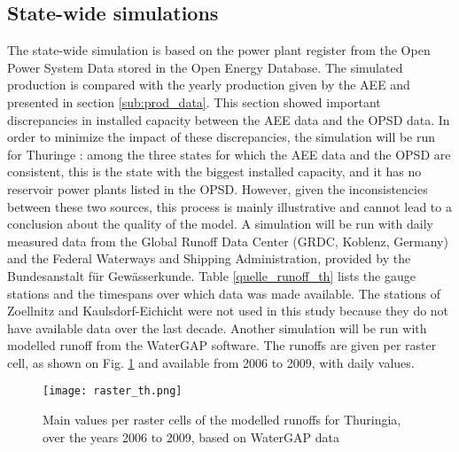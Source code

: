 \subsection{State-wide simulations} 
\label{sub:metho_sw}
The state-wide simulation is based on the power plant register from the Open Power System Data stored in the Open Energy Database. The simulated production is compared with the yearly production given by the AEE and presented in section \ref{sub:prod_data}. This section showed important discrepancies in installed capacity between the AEE data and the OPSD data. In order to minimize the impact of these discrepancies, the simulation will be run for Thuringe : among the three states for which the AEE data and the OPSD are consistent, this is the state with the biggest installed capacity, and it has no reservoir power plants listed in the OPSD. However, given the inconsistencies between these two sources, this process is mainly illustrative and cannot lead to a conclusion about the quality of the model. \newline
A simulation will be run with daily measured data from the Global Runoff Data Center (GRDC, Koblenz, Germany) and the Federal Waterways and Shipping Administration, provided by the Bundesanstalt für Gewässerkunde. Table \ref{quelle_runoff_th} lists the gauge stations and the timespans over which data was made available. The stations of Zoellnitz and Kaulsdorf-Eichicht were not used in this study because they do not have available data over the last decade. Another simulation will be run with modelled runoff from the WaterGAP software. The runoffs are given per raster cell, as shown on Fig. \ref{raster_th} and available from 2006 to 2009, with daily values.

\begin{figure}[H]
\centering
\texttt{[image: raster\_th.png]}
\caption{Main values per raster cells of the modelled runoffs for Thuringia, over the years 2006 to 2009, based on WaterGAP data}
\label{raster_th}
\end{figure}


